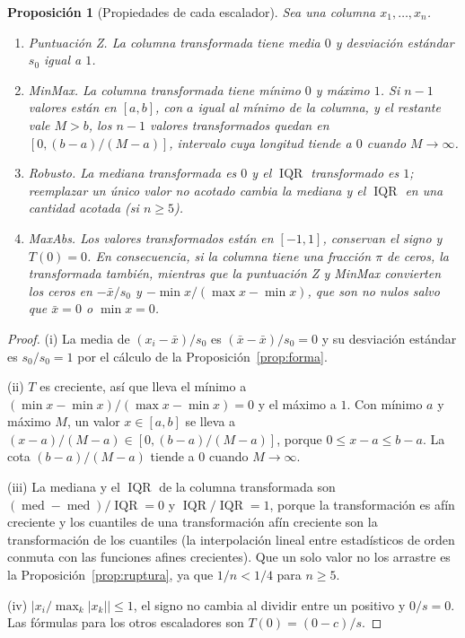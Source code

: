 \documentclass[11pt]{article}
\newtheorem{proposicion}[teorema]{Proposición}
\theoremstyle{definition}
\theoremstyle{remark}
\DeclareMathOperator{\med}{med}
\DeclareMathOperator{\IQR}{IQR}
\newcommand{\abs}[1]{\left\lvert #1\right\rvert}
\begin{document}
\begin{proposicion}[Propiedades de cada escalador]\label{prop:escaladores}
\noindent Sea una columna $x_1,\dots,x_n$.
\begin{enumerate}[label=(\roman*)]
\item \emph{Puntuación Z.} La columna transformada tiene media $0$ y desviación estándar $s_0$ igual a $1$.
\item \emph{MinMax.} La columna transformada tiene mínimo $0$ y máximo $1$. Si $n-1$ valores están en $[a,b]$, con $a$ igual al mínimo de la columna, y el restante vale $M>b$, los $n-1$ valores transformados quedan en $[0,(b-a)/(M-a)]$, intervalo cuya longitud tiende a $0$ cuando $M\to\infty$.
\item \emph{Robusto.} La mediana transformada es $0$ y el $\IQR$ transformado es $1$; reemplazar un único valor no acotado cambia la mediana y el $\IQR$ en una cantidad acotada (si $n\ge5$).
\item \emph{MaxAbs.} Los valores transformados están en $[-1,1]$, conservan el signo y $T(0)=0$. En consecuencia, si la columna tiene una fracción $\pi$ de ceros, la transformada también, mientras que la puntuación Z y MinMax convierten los ceros en $-\bar x/s_0$ y $-\min x/(\max x-\min x)$, que son no nulos salvo que $\bar x=0$ o $\min x=0$.
\end{enumerate}
\end{proposicion}
\begin{proof}
\noindent (i) La media de $(x_i-\bar x)/s_0$ es $(\bar x-\bar x)/s_0=0$ y su desviación estándar es $s_0/s_0=1$ por el cálculo de la Proposición~\ref{prop:forma}.

\medskip

\noindent (ii) $T$ es creciente, así que lleva el mínimo a $(\min x-\min x)/(\max x-\min x)=0$ y el máximo a $1$. Con mínimo $a$ y máximo $M$, un valor $x\in[a,b]$ se lleva a $(x-a)/(M-a)\in[0,(b-a)/(M-a)]$, porque $0\le x-a\le b-a$. La cota $(b-a)/(M-a)$ tiende a $0$ cuando $M\to\infty$.

\medskip

\noindent (iii) La mediana y el $\IQR$ de la columna transformada son $(\med-\med)/\IQR=0$ y $\IQR/\IQR=1$, porque la transformación es afín creciente y los cuantiles de una transformación afín creciente son la transformación de los cuantiles (la interpolación lineal entre estadísticos de orden conmuta con las funciones afines crecientes). Que un solo valor no los arrastre es la Proposición~\ref{prop:ruptura}, ya que $1/n<1/4$ para $n\ge5$.

\medskip

\noindent (iv) $\abs{x_i/\max_k\abs{x_k}}\le1$, el signo no cambia al dividir entre un positivo y $0/s=0$. Las fórmulas para los otros escaladores son $T(0)=(0-c)/s$.
\end{proof}
\end{document}
